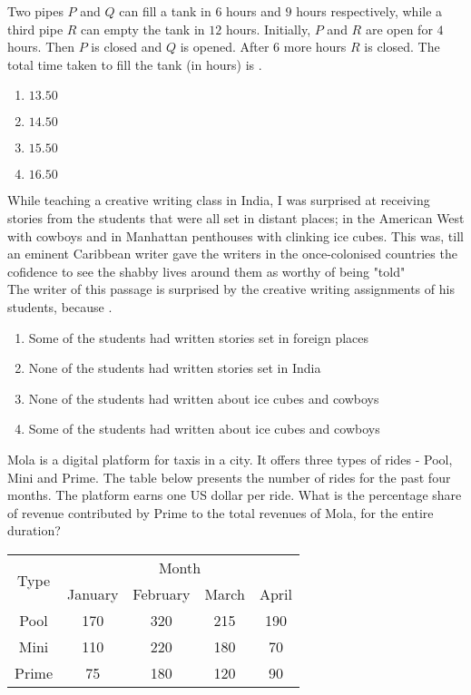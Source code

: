 	\item Two pipes $P$ and $Q$ can fill a tank in $6$ hours and $9$ hours respectively, while a third pipe $R$ can empty the tank in $12$ hours. Initially, $P$ and $R$ are open for $4$ hours. Then $P$ is closed and $Q$ is opened. After $6$ more hours $R$ is closed. The total time taken to fill the tank (in hours) is \underline{\hspace{2cm}}.
		\begin{enumerate}                           
                        \item $13.50$                  
                        \item $14.50$                 
                        \item $15.50$
                        \item $16.50$
		\end{enumerate}
	\item While teaching a creative writing class in India, I was surprised at receiving stories from the students that were all set in distant places; in the American West with cowboys and in Manhattan penthouses with clinking ice cubes. This was, till an eminent Caribbean writer gave the writers in the once-colonised countries the cofidence to see the shabby lives around them as worthy of being "told"\\ The writer of this passage is surprised by the creative writing assignments of his students, because \underline{\hspace{2cm}}.
		\begin{enumerate}
			\item Some of the students had written stories set in foreign places
			\item None of the students had written stories set in India
			\item None of the students had written about ice cubes and cowboys
			\item Some of the students had written about ice cubes and cowboys
		\end{enumerate}
	\item Mola is a digital platform for taxis in a city. It offers three types of rides - Pool, Mini and Prime. The table below presents the number of rides for the past four months. The platform earns one US dollar per ride. What is the percentage share of revenue contributed by Prime to the total revenues of Mola, for the entire duration?
\begin{table}[h!]
\centering
\begin{tabular}{|c|c|c|c|c|}
\hline
\multirow{2}{*}{Type} & \multicolumn{4}{c|}{Month} \\
\cline{2-5}
& January & February & March & April \\
\hline
Pool & 170 & 320 & 215 & 190 \\
\hline
Mini & 110 & 220 & 180 & 70 \\
\hline
Prime & 75 & 180 & 120 & 90 \\
\hline
\end{tabular}

\end{table}
